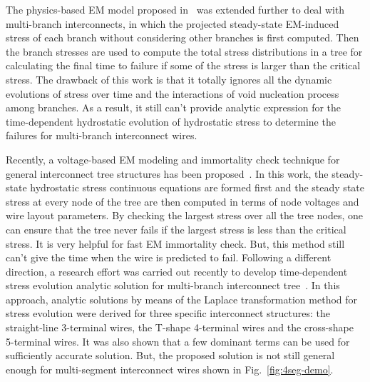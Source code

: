 The physics-based EM model proposed
in~\cite{HuangYu:DAC'14,HuangTan:TCAD'16} was extended further to deal
with multi-branch interconnects, in which the projected steady-state
EM-induced stress of each branch without considering other branches is
first computed. Then the branch stresses are used to compute the total
stress distributions in a tree for calculating the final time to
failure if some of the stress is larger than the critical stress. The
drawback of this work is that it totally ignores all the dynamic
evolutions of stress over time and the interactions of void nucleation
process among branches. As a result, it still can't provide analytic
expression for the time-dependent hydrostatic evolution of hydrostatic
stress to determine the failures for multi-branch interconnect wires.

Recently, a voltage-based EM modeling and immortality check technique
for general interconnect tree structures has been
proposed~\cite{SunDemircan:ICCAD'16}. In this work, the steady-state
hydrostatic stress continuous equations are formed first and the
steady state stress at every node of the tree are then computed in
terms of node voltages and wire layout parameters. By checking the
largest stress over all the tree nodes, one can ensure that the tree
never fails if the largest stress is less than the critical stress. It
is very helpful for fast EM immortality check. But, this method still
can't give the time when the wire is predicted to fail. Following a
different direction, a research effort was carried out recently to
develop time-dependent stress evolution analytic solution for
multi-branch interconnect
tree~\cite{ChenHuang:DAC'15,ChenTan:TCAD'16}.  In this approach,
analytic solutions by means of the Laplace transformation method for
stress evolution were derived for three specific interconnect
structures: the straight-line 3-terminal wires, the T-shape 4-terminal
wires and the cross-shape 5-terminal wires. It was also shown that a
few dominant terms can be used for sufficiently accurate
solution. But, the proposed solution is not still general enough for
multi-segment interconnect wires shown in Fig.~\ref{fig:4seg-demo}.




